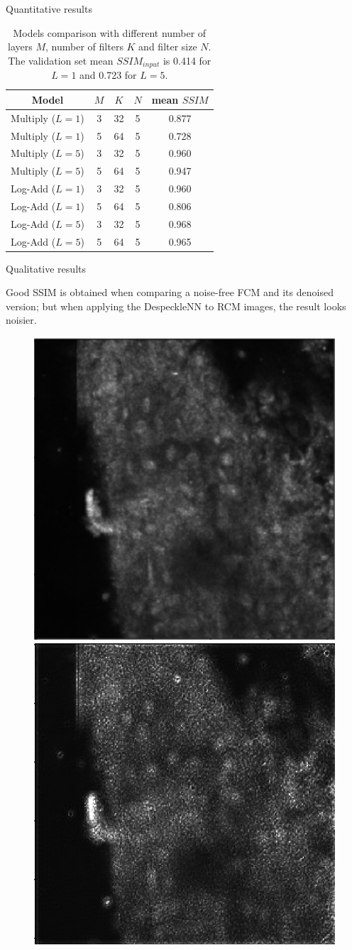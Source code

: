 \documentclass[t]{beamer}
\begin{document}
\begin{frame}{Quantitative results}

\begin{table}
\centering
\begin{tabular}{*5c}
\toprule
Model & $M$ & $K$ & $N$ & mean $SSIM$ \\
\midrule
Multiply ($L = 1$) & 3 & 32 & 5 & 0.877 \\
Multiply ($L = 1$) & 5 & 64 & 5 & 0.728 \\
Multiply ($L = 5$) & 3 & 32 & 5 & 0.960 \\
Multiply ($L = 5$) & 5 & 64 & 5 & 0.947 \\

Log-Add ($L = 1$) & 3 & 32 & 5 & 0.960 \\
Log-Add ($L = 1$) & 5 & 64 & 5 & 0.806 \\
Log-Add ($L = 5$) & 3 & 32 & 5 & 0.968 \\
Log-Add ($L = 5$) & 5 & 64 & 5 & 0.965 \\
\bottomrule
\end{tabular}
\caption{Models comparison with different number of layers $M$, number
of filters $K$ and filter size $N$. The validation set mean $SSIM_{input}$
is 0.414 for $L=1$ and 0.723 for $L=5$.}
\end{table}

\end{frame}

\begin{frame}{Qualitative results}

Good SSIM is obtained when comparing a noise-free FCM and its denoised version;
but when applying the DespeckleNN to RCM images,
the result looks noisier.

\begin{figure}
\centering
\includegraphics[width=.3\linewidth]{noisy-R}\hspace{0.15\textwidth}%
\includegraphics[width=.3\linewidth]{denoised-R}
\end{figure}

\end{frame}
\end{document}

